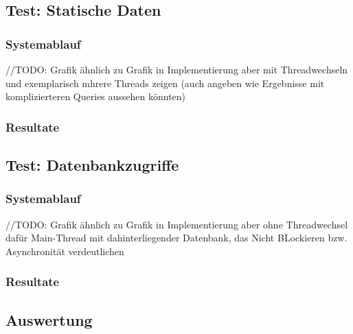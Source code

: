 \subsection{Test: Statische Daten}
\label{section:statische_daten}

\subsubsection{Systemablauf}
//TODO: Grafik ähnlich zu Grafik in Implementierung aber mit Threadwechseln und exemplarisch mhrere Threads zeigen
(auch angeben wie Ergebnisse mit komplizierteren Queries aussehen könnten)
\subsubsection{Resultate}

\subsection{Test: Datenbankzugriffe}
\label{section:datenbankzugriffe}

\subsubsection{Systemablauf}
//TODO: Grafik ähnlich zu Grafik in Implementierung aber ohne Threadwechsel dafür Main-Thread mit dahinterliegender Datenbank,
das Nicht BLockieren bzw. Asynchronität verdeutlichen

\subsubsection{Resultate}

\subsection{Auswertung}
\label{section:auswertung}